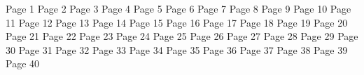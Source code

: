 \documentclass[12pt, a4paper]{article}
\begin{document}
Page 1
\newpage
Page 2
\newpage
Page 3
\newpage
Page 4
\newpage
Page 5
\newpage
Page 6
\newpage
Page 7
\newpage
Page 8
\newpage
Page 9
\newpage
Page 10
\newpage
Page 11
\newpage
Page 12
\newpage
Page 13
\newpage
Page 14
\newpage
Page 15
\newpage
Page 16
\newpage
Page 17
\newpage
Page 18
\newpage
Page 19
\newpage
Page 20
\newpage
Page 21
\newpage
Page 22
\newpage
Page 23
\newpage
Page 24
\newpage
Page 25
\newpage
Page 26
\newpage
Page 27
\newpage
Page 28
\newpage
Page 29
\newpage
Page 30
\newpage
Page 31
\newpage
Page 32
\newpage
Page 33
\newpage
Page 34
\newpage
Page 35
\newpage
Page 36
\newpage
Page 37
\newpage
Page 38
\newpage
Page 39
\newpage
Page 40
\end{document}
